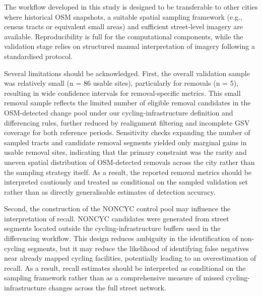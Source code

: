 \documentclass[
]{article}
\begin{document}
The workflow developed in this study is designed to be transferable to
other cities where historical OSM snapshots, a suitable spatial sampling
framework (e.g., census tracts or equivalent small areas) and sufficient
street-level imagery are available. \color{black}Reproducibility is full
for the computational components, while the validation stage relies on
structured manual interpretation of imagery following a standardised
protocol.\color{black}

Several limitations should be acknowledged. First, the
\color{black}overall validation sample was relatively small (n = 86
usable sites), particularly for removals (n = 5), \color{black}
resulting in wide confidence intervals for removal-specific metrics.
This small removal sample reflects the limited number of eligible
removal candidates in the OSM-detected change pool under our
cycling-infrastructure definition and differencing rules, further
reduced by realignment filtering and incomplete GSV coverage for both
reference periods. Sensitivity checks expanding the number of sampled
tracts and candidate removal segments yielded only marginal gains in
usable removal sites, indicating that the primary constraint was the
rarity and uneven spatial distribution of OSM-detected removals across
the city rather than the sampling strategy itself. \color{black} As a
result, the reported removal metrics should be interpreted cautiously
and treated as conditional on the sampled validation set rather than as
directly generalisable estimates of detection accuracy. \color{black}

\color{black}Second, the construction of the NONCYC control pool may
influence the interpretation of recall. NONCYC candidates were generated
from street segments located outside the cycling-infrastructure buffers
used in the differencing workflow. This design reduces ambiguity in the
identification of non-cycling segments, but it may reduce the likelihood
of identifying false negatives near already mapped cycling facilities,
potentially leading to an overestimation of recall. As a result, recall
estimates should be interpreted as conditional on the sampling framework
rather than as a comprehensive measure of missed cycling-infrastructure
changes across the full street network.\color{black}
\end{document}
